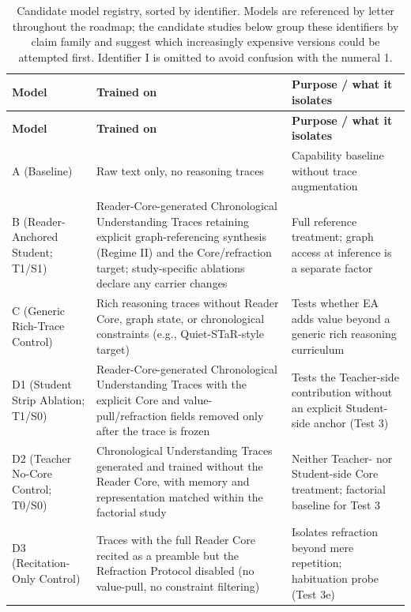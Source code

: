\begingroup
\footnotesize
\setlength{\tabcolsep}{3pt}
\begin{longtable}{
  >{\raggedright\arraybackslash}p{3.1cm}
  >{\raggedright\arraybackslash}p{5.5cm}
  >{\raggedright\arraybackslash}p{6.4cm}}
\caption{Candidate model registry, sorted by identifier. Models are referenced by letter throughout the roadmap; the candidate studies below group these identifiers by claim family and suggest which increasingly expensive versions could be attempted first. Identifier I is omitted to avoid confusion with the numeral 1.}
\label{tab:model-registry}\\
\toprule
\textbf{Model} & \textbf{Trained on} & \textbf{Purpose / what it isolates} \\
\midrule
\endfirsthead
\toprule
\textbf{Model} & \textbf{Trained on} & \textbf{Purpose / what it isolates} \\
\midrule
\endhead
\bottomrule
\endlastfoot
        A (Baseline) & Raw text only, no reasoning traces & Capability baseline without trace augmentation \\
        B (Reader-Anchored Student; T1/S1) & Reader-Core-generated Chronological Understanding Traces retaining explicit graph-referencing synthesis (Regime II) and the Core/refraction target; study-specific ablations declare any carrier changes & Full reference treatment; graph access at inference is a separate factor \\
        C (Generic Rich-Trace Control) & Rich reasoning traces without Reader Core, graph state, or chronological constraints (e.g., Quiet-STaR-style target) & Tests whether EA adds value beyond a generic rich reasoning curriculum \\
	        D1 (Student Strip Ablation; T1/S0) & Reader-Core-generated Chronological Understanding Traces with the explicit Core and value-pull/refraction fields removed only after the trace is frozen & Tests the Teacher-side contribution without an explicit Student-side anchor (Test 3) \\
        D2 (Teacher No-Core Control; T0/S0) & Chronological Understanding Traces generated and trained without the Reader Core, with memory and representation matched within the factorial study & Neither Teacher- nor Student-side Core treatment; factorial baseline for Test 3 \\
        D3 (Recitation-Only Control) & Traces with the full Reader Core recited as a preamble but the Refraction Protocol disabled (no value-pull, no constraint filtering) & Isolates refraction beyond mere repetition; habituation probe (Test 3e) \\

\end{longtable}
